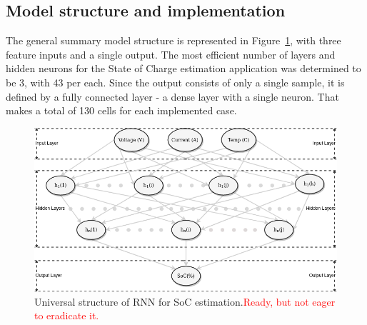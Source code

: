 \subsection{Model structure and implementation} \label{subsec:structure}
The general summary model structure is represented in \mbox{Figure~\ref{fig:RNN-structure}}, with three feature inputs and a single output.
The most efficient number of layers and hidden neurons for the State of Charge estimation application was determined to be 3, with 43 per each.
Since the output consists of only a single sample, it is defined by a fully connected layer - a dense layer with a single neuron.
That makes a total of 130 cells for each implemented case.
\begin{figure}[htbp]
    \centering
    \includegraphics[width=\columnwidth]{II_Body/images/SoC-RNN.png}
    \caption{Universal structure of RNN for SoC estimation.\textcolor{red}{Ready, but not eager to eradicate it.}}
    \label{fig:RNN-structure}
\end{figure}

